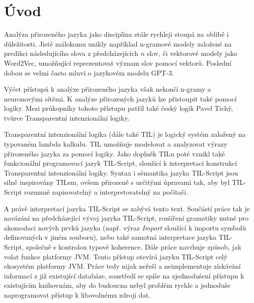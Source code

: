 \chapter{Úvod}
\label{sec:Introduction}


Analýza přirozeného jazyka jako disciplína stále rychleji stoupá na oblibě i důležitosti. Jistě
málokomu unikly například n-gramové modely založené na predikci následujícího slova
z předcházejících $n$ slov, či vektorové modely jako Word2Vec, umožňující reprezentovat význam
slov pomocí vektorů. Poslední dobou se velmi často mluví o jazykovém modelu GPT-3.

Výčet přístupů k analýze přirozeného jazyka však nekončí n-gramy a neuronovými sítěmi. K analýze
přirozených jazyků lze přistoupit také pomocí logiky. Mezi průkopníky tohoto přístupu patřil také
český logik Pavel Tichý, tvůrce Transparentní intenzionální logiky.

Transparentní intenzionální logika (dále také TIL) je logický systém založený na typovaném lambda
kalkulu. TIL umožňuje modelovat a analyzovat výrazy přirozeného jazyka za pomocí logiky. Jako
doplněk TILu poté vznikl také funkcionální programovací jazyk TIL-Script, sloužící k interpretaci
konstrukcí Transparentní intenzionální logiky. Syntax i sémantika jazyka TIL-Script jsou silně
inspirovány TILem, ovšem přirozeně s určitými úpravami tak, aby byl TIL-Script rozumně zapisovatelný
a interpretovatelný na počítači.

A právě interpretací jazyka TIL-Script se zabývá tento text. Součástí práce tak je navázání
na předcházející vývoj jazyka TIL-Script, rozšíření gramatiky nutné pro akomodaci nových
prvků jazyka (např. výraz \textit{Import} sloužící k importu symbolů definovaných v jiném
souboru), nebo také samotná interpretace jazyka TIL-Script, společně s kontrolou typové koherence.
Dále práce navrhuje způsob, jak volat funkce platformy JVM. Tento přístup otevírá jazyku TIL-Script
celý ekosystém platformy JVM. Práce tedy nijak neřeší a neimplementuje získávání informací
z již existující databáze, soustředí se spíše na zjednodušení přístupu k existujícím knihovnám, aby
do budoucna nebyl problém rychle a jednoduše naprogramovat přístup k libovolnému zdroji dat.


